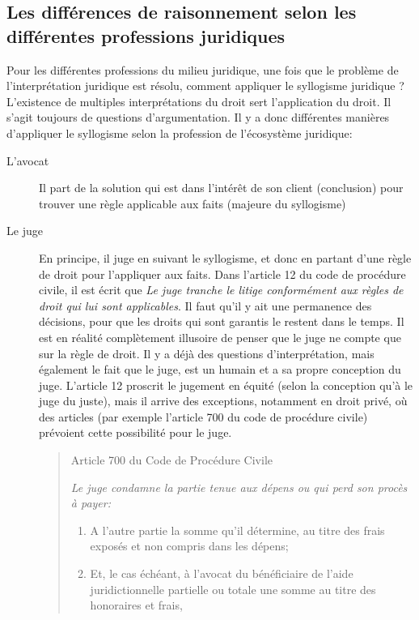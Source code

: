 \documentclass[math]{cours}
\begin{document}
\subsection{Les différences de raisonnement selon les différentes professions juridiques}
Pour les différentes professions du milieu juridique, une fois que le problème de l'interprétation juridique est résolu, comment appliquer le syllogisme juridique ?
L'existence de multiples interprétations du droit sert l'application du droit.
Il s'agit toujours de questions d'argumentation.
Il y a donc différentes manières d'appliquer le syllogisme selon la profession de l'écosystème juridique:
\begin{description}
	\item[L'avocat] Il part de la solution qui est dans l'intérêt de son client (conclusion) pour trouver une règle applicable aux faits (majeure du syllogisme)
	\item[Le juge] En principe, il juge en suivant le syllogisme, et donc en partant d'une règle de droit pour l'appliquer aux faits.
	      Dans l'article 12 du code de procédure civile, il est écrit que \textit{Le juge tranche le litige conformément aux règles de droit qui lui sont applicables}.
	      Il faut qu'il y ait une permanence des décisions, pour que les droits qui sont garantis le restent dans le temps.
	      Il est en réalité complètement illusoire de penser que le juge ne compte que sur la règle de droit.
	      Il y a déjà des questions d'interprétation, mais également le fait que le juge, est un humain et a sa propre conception du juge.
	      L'article 12 proscrit le jugement en équité (selon la conception qu'à le juge du juste), mais il arrive des exceptions, notamment en droit privé, où des articles (par exemple l'article 700 du code de procédure civile) prévoient cette possibilité pour le juge.
	      \begin{quote}
		      \begin{center}
			      Article 700 du Code de Procédure Civile
		      \end{center}
		      {\it Le juge condamne la partie tenue aux dépens ou qui perd son procès à payer:
		      \begin{enumerate}
			      \item A l'autre partie la somme qu'il détermine, au titre des frais exposés et non compris dans les dépens;
			      \item Et, le cas échéant, à l'avocat du bénéficiaire de l'aide juridictionnelle
			            partielle ou totale une somme au titre des honoraires et frais,

\end{enumerate}}
\end{quote}
\end{description}
\end{document}
